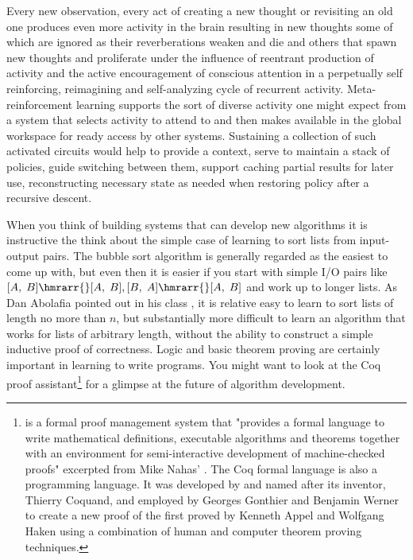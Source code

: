 Every new observation, every act of creating a new thought or revisiting an old one produces even more activity in the brain resulting in new thoughts some of which are ignored as their reverberations weaken and die and others that spawn new thoughts and proliferate under the influence of reentrant production of activity and the active encouragement of conscious attention in a perpetually self reinforcing, reimagining and self-analyzing cycle of recurrent activity. Meta-reinforcement learning supports the sort of diverse activity one might expect from a system that selects activity to attend to and then makes available in the global workspace for ready access by other systems. Sustaining a collection of such activated circuits would help to provide a context, serve to maintain a stack of policies, guide switching between them, support caching partial results for later use, reconstructing necessary state as needed when restoring policy after a recursive descent.

When you think of building systems that can develop new algorithms it is instructive the think about the simple case of learning to sort lists from input-output pairs. The bubble sort algorithm is generally regarded as the easiest to come up with, but even then it is easier if you start with simple I/O pairs like $[A,\;B] \hmrarr{} [A,\;B], [B,\;A] \hmrarr{} [A,\;B]$ and work up to longer lists. As Dan Abolafia pointed out in his class {}, it is relative easy to learn to sort lists of length no more than $n$, but substantially more difficult to learn an algorithm that works for lists of arbitrary length, without the ability to construct a simple inductive proof of correctness. Logic and basic theorem proving are certainly important in learning to write programs. You might want to look at the Coq proof assistant\footnote{%
%
  {} is a formal proof management system that "provides a formal language to write mathematical definitions, executable algorithms and theorems together with an environment for semi-interactive development of machine-checked proofs" \emdash{} excerpted from Mike Nahas' {}. The Coq formal language is also a programming language. It was developed by and named after its inventor, Thierry Coquand, and employed by Georges Gonthier and Benjamin Werner to create a new proof of the {} first proved by Kenneth Appel and Wolfgang Haken using a combination of human and computer theorem proving techniques.} for a glimpse at the future of algorithm development.

